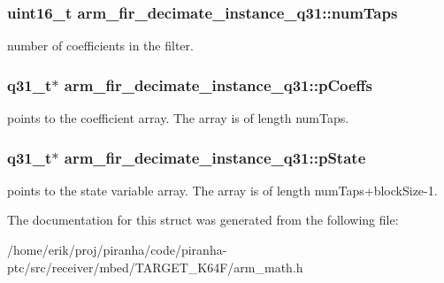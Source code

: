 \subsubsection[{\texorpdfstring{num\+Taps}{numTaps}}]{\setlength{\rightskip}{0pt plus 5cm}uint16\+\_\+t arm\+\_\+fir\+\_\+decimate\+\_\+instance\+\_\+q31\+::num\+Taps}\hypertarget{structarm__fir__decimate__instance__q31_a37915d42b0dc5e3057ebe83110798482}{}\label{structarm__fir__decimate__instance__q31_a37915d42b0dc5e3057ebe83110798482}
number of coefficients in the filter. 
\subsubsection[{\texorpdfstring{p\+Coeffs}{pCoeffs}}]{\setlength{\rightskip}{0pt plus 5cm}q31\+\_\+t$\ast$ arm\+\_\+fir\+\_\+decimate\+\_\+instance\+\_\+q31\+::p\+Coeffs}\hypertarget{structarm__fir__decimate__instance__q31_a030d0391538c2481c5b348fd09a952ff}{}\label{structarm__fir__decimate__instance__q31_a030d0391538c2481c5b348fd09a952ff}
points to the coefficient array. The array is of length num\+Taps. 
\subsubsection[{\texorpdfstring{p\+State}{pState}}]{\setlength{\rightskip}{0pt plus 5cm}q31\+\_\+t$\ast$ arm\+\_\+fir\+\_\+decimate\+\_\+instance\+\_\+q31\+::p\+State}\hypertarget{structarm__fir__decimate__instance__q31_a0ef0ef9e265f7ab873cfc6daa7593fdb}{}\label{structarm__fir__decimate__instance__q31_a0ef0ef9e265f7ab873cfc6daa7593fdb}
points to the state variable array. The array is of length num\+Taps+block\+Size-\/1. 

The documentation for this struct was generated from the following file\+:\begin{DoxyCompactItemize}
\item 
/home/erik/proj/piranha/code/piranha-\/ptc/src/receiver/mbed/\+T\+A\+R\+G\+E\+T\+\_\+\+K64\+F/arm\+\_\+math.\+h\end{DoxyCompactItemize}
